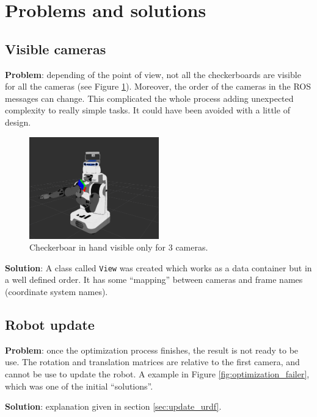 \section{Problems and solutions}

\subsection{Visible cameras}

\textbf{Problem}: depending of the point of view, not all the checkerboards are visible for all the cameras (see Figure \ref{fig:visibility}). Moreover, the order of the cameras in the ROS messages can change. This complicated the whole process adding unexpected complexity to really simple tasks. It could have been avoided with a little of design.

\begin{figure}[!htbp]
 \centering
 \includegraphics[width=0.5\textwidth]{images/screenshots/uncalib05.png}
 \caption{Checkerboar in hand visible only for 3 cameras.}
 \label{fig:visibility}
\end{figure}

\noindent
\textbf{Solution}: A class called \texttt{View} was created which works as a data container but in a well defined order. It has some ``mapping'' between cameras and frame names (coordinate system names).


\subsection{Robot update}

\textbf{Problem}: once the optimization process finishes, the result is not ready to be use. The rotation and translation matrices are relative to the first camera, and cannot be use to update the robot. A example in Figure \ref{fig:optimization_failer}, which was one of the initial ``solutions''.

\noindent
\textbf{Solution}: explanation given in section \ref{sec:update_urdf}.

